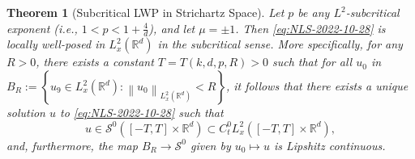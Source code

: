 \documentclass{article}
\newtheorem{theorem}{Theorem}
\def\R{\mathbb{R}} %
\newcommand\norm[1]{\left\lVert#1\right\rVert}
\begin{document}
\begin{theorem}[Subcritical LWP in Strichartz Space]
  \label{thm:subcritical-LWP-in-strichartz-space}
  Let $p$ be any $L^{2}$-subcritical exponent (i.e., $1<p<1+\frac{4}{d}$), and
  let $\mu=\pm 1$. Then \cref{eq:NLS-2022-10-28} is locally well-posed in
  $L_{x}^{2}(\R^d)$ in the subcritical sense. More specifically, for any $R>0$,
  there exists a constant $T=T(k,d,p,R)>0$ such that for all $u_{0}$ in
  $B_{R}:=\left\{u_{9}\in L_{x}^{2}(\R^d):
    \norm{u_{0}}_{L_{x}^{2}(\R^d)}<R\right\}$, it follows that there exists a
  unique solution $u$ to \cref{eq:NLS-2022-10-28} such that
  \begin{equation*}
    u\in \mathcal{S}^{0}\left( [-T,T]\times \R^d \right)
    \subset C_{t}^{0}L_{x}^{2}\left( [-T,T]\times \R^d \right),
  \end{equation*}
  and, furthermore, the map $B_{R}\to \mathcal{S}^{0}$ given by $u_{0}\mapsto u$
  is Lipshitz continuous.
\end{theorem}
\end{document}
